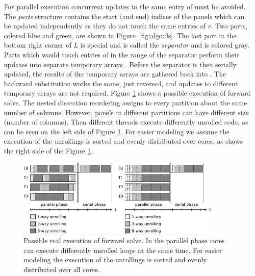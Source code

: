 For parallel execution concurrent updates to the same entry of \vr{} must be
avoided.
The \textit{parts} structure contains the start (and end) indices of the panels
which can be updated independently as they do not touch the same entries of $r$.
Two parts, colored blue and green, are shown in Figure~\ref{fig:algo:ds}.
The last part in the bottom right corner of $L$ is special and is called the 
\textit{separator} and is colored gray.
%
Parts which would touch entries of \vr{} in the range of the separator perform 
their updates into separate temporary arrays \vtemp{}.
Before the separator is then serially updated, the results of the temporary
arrays are gathered back into \vr{}. 
The backward substitution works the same, just reversed, and
updates to different temporary arrays are not required.
Figure \ref{fig:ecm-parallel-model} shows a possible execution of forward solve. The nested dissection reordering assigns to every partition about the same number of columns. However, panels in different partitions can have different size (number of columns). Then different threads execute differently unrolled code, as can be seen on the left side of Figure \ref{fig:ecm-parallel-model}. For easier modeling we assume the execution of the unrollings is sorted and evenly distributed over cores, as shows the right side of the Figure \ref{fig:ecm-parallel-model}.

\begin{figure}[t]
  \centering
  \includegraphics[width=0.9\textwidth,clip=true]{images/ecm-parallel-model}
   \caption{Possible real execution of forward solve. In the parallel phase cores can execute differently unrolled loops at the same time. For easier modeling the execution of the unrollings is sorted and evenly distributed over all cores.}
  \label{fig:ecm-parallel-model}%
\end{figure}

